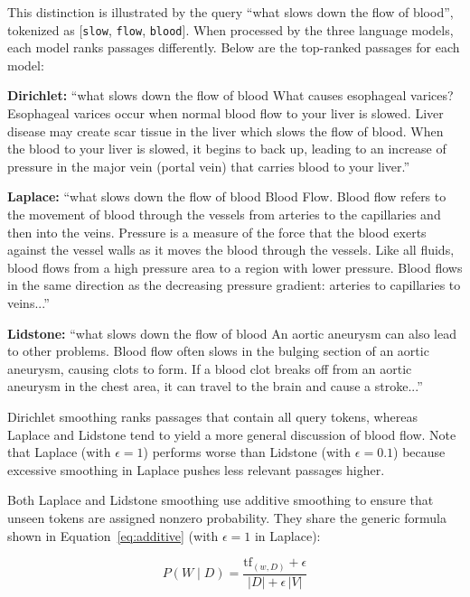 \documentclass[11pt]{article}
\begin{document}
This distinction is illustrated by the query ``what slows down the flow of blood'', tokenized as [\texttt{slow}, \texttt{flow}, \texttt{blood}]. When processed by the three language models, each model ranks passages differently. Below are the top-ranked passages for each model:

\noindent
\textbf{Dirichlet:} ``what slows down the flow of blood \quad What causes esophageal varices? Esophageal varices occur when normal blood flow to your liver is slowed. Liver disease may create scar tissue in the liver which slows the flow of blood. When the blood to your liver is slowed, it begins to back up, leading to an increase of pressure in the major vein (portal vein) that carries blood to your liver.''

\noindent
\textbf{Laplace:} ``what slows down the flow of blood \quad Blood Flow. Blood flow refers to the movement of blood through the vessels from arteries to the capillaries and then into the veins. Pressure is a measure of the force that the blood exerts against the vessel walls as it moves the blood through the vessels. Like all fluids, blood flows from a high pressure area to a region with lower pressure. Blood flows in the same direction as the decreasing pressure gradient: arteries to capillaries to veins...''

\noindent
\textbf{Lidstone:} ``what slows down the flow of blood \quad An aortic aneurysm can also lead to other problems. Blood flow often slows in the bulging section of an aortic aneurysm, causing clots to form. If a blood clot breaks off from an aortic aneurysm in the chest area, it can travel to the brain and cause a stroke...''

Dirichlet smoothing ranks passages that contain all query tokens, whereas Laplace and Lidstone tend to yield a more general discussion of blood flow. Note that Laplace (with \(\epsilon = 1\)) performs worse than Lidstone (with \(\epsilon = 0.1\)) because excessive smoothing in Laplace pushes less relevant passages higher.

Both Laplace and Lidstone smoothing use additive smoothing to ensure that unseen tokens are assigned nonzero probability. They share the generic formula shown in Equation~\ref{eq:additive} (with \(\epsilon=1\) in Laplace):

\begin{equation}
P(W \mid D) = \frac{\mathrm{tf}_{(w,D)} + \epsilon}{|D| + \epsilon \, |V|}
\label{eq:additive}
\end{equation}
\end{document}
